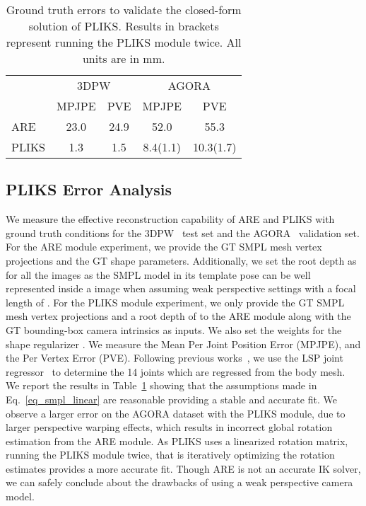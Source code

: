 \documentclass[10pt,twocolumn,letterpaper]{article}
\begin{document}
\begin{table}[]
\footnotesize
\centering
\begin{tabular}{l|cccc}
      & \multicolumn{2}{c}{3DPW}          & \multicolumn{2}{c}{AGORA} \\ \cline{2-5} 
      & MPJPE & \multicolumn{1}{c|}{PVE}  & MPJPE        & PVE        \\ \hline
ARE   & 23.0  & \multicolumn{1}{c|}{24.9} & 52.0         & 55.3       \\
PLIKS & 1.3   & \multicolumn{1}{c|}{1.5}  & 8.4(1.1)          & 10.3(1.7)       \\\hline
\end{tabular}\caption{\label{tab:pea}Ground truth errors to validate the closed-form solution of PLIKS. Results in brackets represent running the PLIKS module twice. All units are in mm.}
\end{table}








\subsection{PLIKS Error Analysis}
 We measure the effective reconstruction capability of ARE and PLIKS with ground truth conditions for the 3DPW~\cite{3dpw} test set and the AGORA~\cite{agora} validation set. For the ARE module experiment, we provide the GT SMPL mesh vertex projections and the GT shape parameters. Additionally, we set the root depth as  for all the images as the SMPL model in its template pose can be well represented inside a  image when assuming weak perspective settings with a focal length of . For the PLIKS module experiment, we only provide the GT SMPL mesh vertex projections and a root depth of  to the ARE module along with the GT bounding-box camera intrinsics as inputs. We also set the weights for the shape regularizer .  We measure the Mean Per Joint Position Error (MPJPE), and the Per Vertex Error (PVE). Following previous works~\cite{spin,hmr,pare}, we use the LSP joint regressor~\cite{spin} to determine the 14 joints which are regressed from the body mesh. We report the results in Table~\ref{tab:pea} showing that the assumptions made in Eq.~\eqref{eq_smpl_linear} are reasonable providing a stable and accurate fit. We observe a larger error on the AGORA dataset with the PLIKS module, due to larger perspective warping effects, which results in incorrect global rotation estimation from the ARE module. As PLIKS uses a linearized rotation matrix, running the PLIKS module twice, that is iteratively optimizing the rotation estimates provides a more accurate fit. Though ARE is not an accurate IK solver, we can safely conclude about the drawbacks of using a weak perspective camera model.
\end{document}

